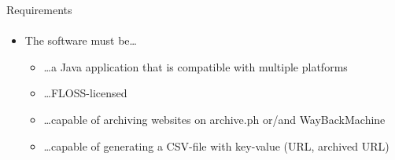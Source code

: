 \documentclass[
    ngerman,%
    authorontitle=true,
]{bfhbeamer}
\begin{document}
    \begin{frame}{Requirements}
        \framesubtitle{}
        \begin{itemize}
            \item The software must be\ldots
            \begin{itemize}
                \item \ldots a Java application that is compatible with multiple platforms
                \item \ldots FLOSS-licensed
                \item \ldots capable of archiving websites on archive.ph or/and WayBackMachine
                \item \ldots capable of generating a CSV-file with key-value (URL, archived URL)
            \end{itemize}
        \end{itemize}

    \end{frame}
\end{document}
